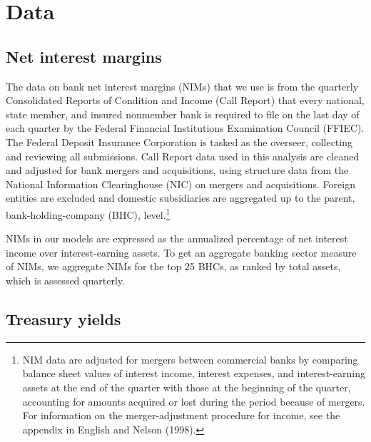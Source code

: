 \documentclass[11pt]{article}
\renewcommand{\baselinestretch}{1.5}
\begin{document}

\section{Data}

\vspace{-0.1in}

\subsection{Net interest margins}

\vspace{-0.1in} The data on bank net interest margins (NIMs) that we use is from the quarterly Consolidated Reports of Condition and Income (Call Report) that every national, state member, and insured nonmember bank is required to file on the last day of each quarter by the Federal Financial Institutions Examination Council (FFIEC). The Federal Deposit Insurance Corporation is tasked as the overseer, collecting and reviewing all submissions. Call Report data used in this analysis are cleaned and adjusted for bank mergers and acquisitions, using structure data from the National Information Clearinghouse (NIC) on mergers and acquisitions. Foreign entities are excluded and domestic subsidiaries are aggregated up to the parent, bank-holding-company (BHC), level.\renewcommand{\baselinestretch}{1}\footnote{NIM data are adjusted for mergers between commercial banks by comparing balance sheet values of interest income, interest expenses, and interest-earning assets at the end of the quarter with those at the beginning of the quarter, accounting for amounts acquired or lost during the period because of mergers. For information on the merger-adjustment procedure for income, see the appendix in English and Nelson (1998).\vspace{0.05in}}\renewcommand{\baselinestretch}{1.5}

NIMs in our models are expressed as the annualized percentage of net interest income over interest-earning assets. To get an aggregate banking sector measure of NIMs, we aggregate NIMs for the top 25 BHCs, as ranked by total assets, which is assessed quarterly.

\subsection{Treasury yields}
\end{document}
